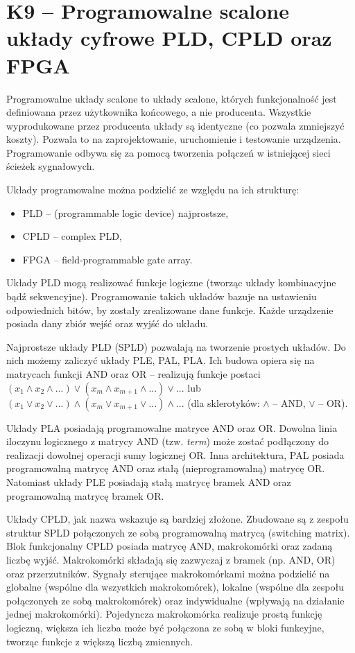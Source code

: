\sloppy\section{K9 -- Programowalne scalone układy cyfrowe PLD, CPLD oraz FPGA}

Programowalne układy scalone to układy scalone, których funkcjonalność jest definiowana przez użytkownika końcowego, a nie producenta. Wszystkie wyprodukowane przez producenta układy są identyczne (co pozwala zmniejszyć koszty). Pozwala to na zaprojektowanie, uruchomienie i testowanie urządzenia. Programowanie odbywa się za pomocą tworzenia połączeń w istniejącej sieci ścieżek sygnałowych. 

Układy programowalne można podzielić ze względu na ich strukturę:
\begin{itemize}
\item PLD -- (programmable logic device) najprostsze,
\item CPLD -- complex PLD,
\item FPGA -- field-programmable gate array.
\end{itemize}

Układy PLD mogą realizować funkcje logiczne (tworząc układy kombinacyjne bądź sekwencyjne). Programowanie takich układów bazuje na ustawieniu odpowiednich bitów, by zostały zrealizowane dane funkcje. Każde urządzenie posiada dany zbiór wejść oraz wyjść do układu.

Najprostsze układy PLD (SPLD) pozwalają na tworzenie prostych układów. Do nich możemy zaliczyć układy PLE, PAL, PLA. Ich budowa opiera się na matrycach funkcji AND oraz OR -- realizują funkcje postaci $(x_{1} \wedge x_{2} \wedge ...) \vee (x_{m} \wedge x_{m+1} \wedge ...) \vee ...$ lub $(x_{1} \vee x_{2} \vee ...) \wedge (x_{m} \vee x_{m+1} \vee ...) \wedge ...$ (dla sklerotyków: $\wedge$ -- AND, $\vee$ -- OR). 

Układy PLA posiadają programowalne matryce AND oraz OR. Dowolna linia iloczynu logicznego z matrycy AND (tzw. \textit{term}) może zostać podłączony do realizacji dowolnej operacji sumy logicznej OR. Inna architektura, PAL posiada programowalną matrycę AND oraz stałą (nieprogramowalną) matrycę OR. Natomiast układy PLE posiadają stałą matrycę bramek AND oraz programowalną matrycę bramek OR.

Układy CPLD, jak nazwa wskazuje są bardziej złożone. Zbudowane są z zespołu struktur SPLD połączonych ze sobą programowalną matrycą (switching matrix). Blok funkcjonalny CPLD posiada matrycę AND, makrokomórki oraz zadaną liczbę wyjść. Makrokomórki składają się zazwyczaj z bramek (np. AND, OR) oraz przerzutników. Sygnały sterujące makrokomórkami można podzielić na globalne (wspólne dla wszystkich makrokomórek), lokalne (wspólne dla zespołu połączonych ze sobą makrokomórek) oraz indywidualne (wpływają na działanie jednej makrokomórki). Pojedyncza makrokomórka realizuje prostą funkcję logiczną, większa ich liczba może być połączona ze sobą w bloki funkcyjne, tworząc funkcje z większą liczbą zmiennych. 

